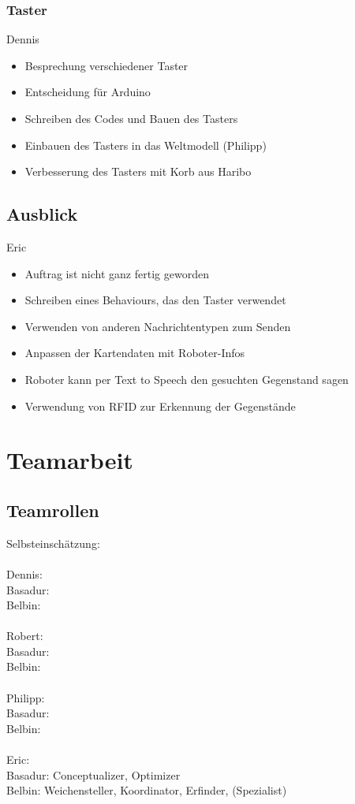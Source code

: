 \documentclass[a4paper,12pt,headsepline,toc=flat]{scrartcl}
\begin{document}
			\subsubsection{Taster}
			Dennis\\
			\begin{itemize}
				\item Besprechung verschiedener Taster
				\item Entscheidung für Arduino
				\item Schreiben des Codes und Bauen des Tasters
				\item Einbauen des Tasters in das Weltmodell (Philipp)
				\item Verbesserung des Tasters mit Korb aus Haribo
			\end{itemize}
	
	\subsection{Ausblick}
	Eric \\
	\begin{itemize}
		\item Auftrag ist nicht ganz fertig geworden
		\item Schreiben eines Behaviours, das den Taster verwendet
		\item Verwenden von anderen Nachrichtentypen zum Senden
		\item Anpassen der Kartendaten mit Roboter-Infos
		\item Roboter kann per Text to Speech den gesuchten Gegenstand sagen
		\item Verwendung von RFID zur Erkennung der Gegenstände
	\end{itemize}
	\newpage
	\section{Teamarbeit}
	
	\subsection{Teamrollen}
		Selbsteinschätzung:\\\\
		Dennis:\\
		Basadur: \\
		Belbin: \\\\
		Robert:\\
		Basadur: \\
		Belbin: \\\\
		Philipp:\\
		Basadur: \\
		Belbin: \\\\
		Eric:\\
		Basadur: Conceptualizer, Optimizer\\
		Belbin: Weichensteller, Koordinator, Erfinder, (Spezialist)\\
\end{document}
